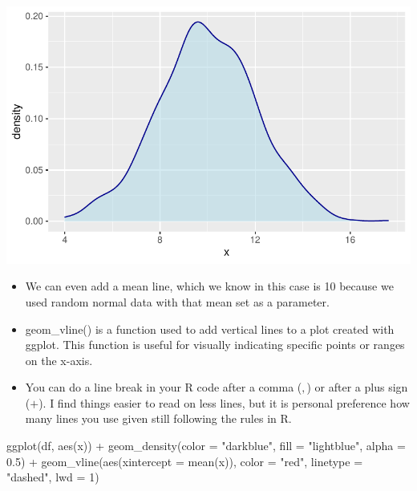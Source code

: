 \documentclass[
  letterpaper,
  DIV=11,
  numbers=noendperiod]{scrreprt}
\newenvironment{Shaded}{\begin{snugshade}}{\end{snugshade}}
\newcommand{\AttributeTok}[1]{\textcolor[rgb]{0.40,0.45,0.13}{#1}}
\newcommand{\DecValTok}[1]{\textcolor[rgb]{0.68,0.00,0.00}{#1}}
\newcommand{\FloatTok}[1]{\textcolor[rgb]{0.68,0.00,0.00}{#1}}
\newcommand{\FunctionTok}[1]{\textcolor[rgb]{0.28,0.35,0.67}{#1}}
\newcommand{\NormalTok}[1]{\textcolor[rgb]{0.00,0.23,0.31}{#1}}
\newcommand{\SpecialCharTok}[1]{\textcolor[rgb]{0.37,0.37,0.37}{#1}}
\newcommand{\StringTok}[1]{\textcolor[rgb]{0.13,0.47,0.30}{#1}}
\providecommand{\tightlist}{%
  \setlength{\itemsep}{0pt}\setlength{\parskip}{0pt}}\usepackage{longtable,booktabs,array}
\begin{document}
\includegraphics{dataviz_files/figure-pdf/unnamed-chunk-23-1.pdf}

\begin{itemize}
\tightlist
\item
  We can even add a mean line, which we know in this case is 10 because
  we used random normal data with that mean set as a parameter.
\item
  geom\_vline() is a function used to add vertical lines to a plot
  created with ggplot. This function is useful for visually indicating
  specific points or ranges on the x-axis.
\item
  You can do a line break in your R code after a comma (\(,\)) or after
  a plus sign (\(+\)). I find things easier to read on less lines, but
  it is personal preference how many lines you use given still following
  the rules in R.
\end{itemize}

\begin{Shaded}
\begin{Highlighting}[]
\FunctionTok{ggplot}\NormalTok{(df, }\FunctionTok{aes}\NormalTok{(x)) }\SpecialCharTok{+} \FunctionTok{geom\_density}\NormalTok{(}\AttributeTok{color =} \StringTok{"darkblue"}\NormalTok{, }\AttributeTok{fill =} \StringTok{"lightblue"}\NormalTok{,}
    \AttributeTok{alpha =} \FloatTok{0.5}\NormalTok{) }\SpecialCharTok{+} \FunctionTok{geom\_vline}\NormalTok{(}\FunctionTok{aes}\NormalTok{(}\AttributeTok{xintercept =} \FunctionTok{mean}\NormalTok{(x)), }\AttributeTok{color =} \StringTok{"red"}\NormalTok{,}
    \AttributeTok{linetype =} \StringTok{"dashed"}\NormalTok{, }\AttributeTok{lwd =} \DecValTok{1}\NormalTok{)}
\end{Highlighting}
\end{Shaded}
\end{document}
